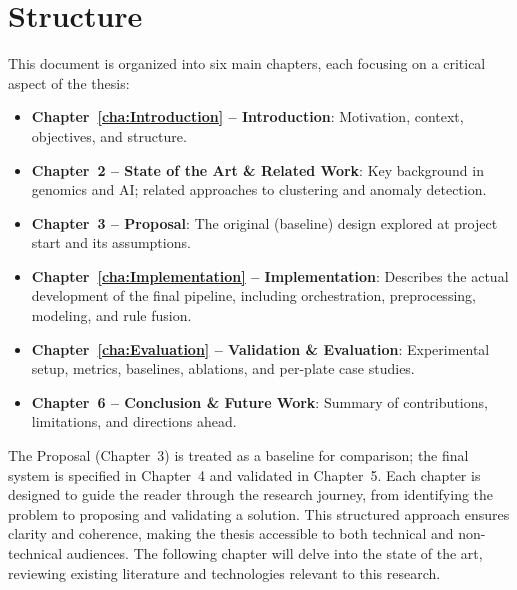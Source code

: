 \section{Structure}
\label{sec:Structure}

This document is organized into six main chapters, each focusing on a critical aspect of the thesis:

\begin{itemize}
  \item \textbf{Chapter~\ref{cha:Introduction} -- Introduction}: Motivation, context, objectives, and structure.
  \item \textbf{Chapter~2 -- State of the Art \& Related Work}: Key background in genomics and AI; related approaches to clustering and anomaly detection.
  \item \textbf{Chapter~3 -- Proposal}: The original (baseline) design explored at project start and its assumptions.
  \item \textbf{Chapter~\ref{cha:Implementation} -- Implementation}: Describes the actual development of the final pipeline, including orchestration, preprocessing, modeling, and rule fusion.
  \item \textbf{Chapter~\ref{cha:Evaluation} -- Validation \& Evaluation}: Experimental setup, metrics, baselines, ablations, and per-plate case studies.
  \item \textbf{Chapter~6 -- Conclusion \& Future Work}: Summary of contributions, limitations, and directions ahead.
\end{itemize}


The Proposal (Chapter~3) is treated as a baseline for comparison; the final system is specified in Chapter~4 and validated in Chapter~5.
Each chapter is designed to guide the reader through the research journey, from identifying the problem to proposing and validating a solution. This structured approach ensures clarity and coherence, making the thesis accessible to both technical and non-technical audiences.
The following chapter will delve into the state of the art, reviewing existing literature and technologies relevant to this research.
